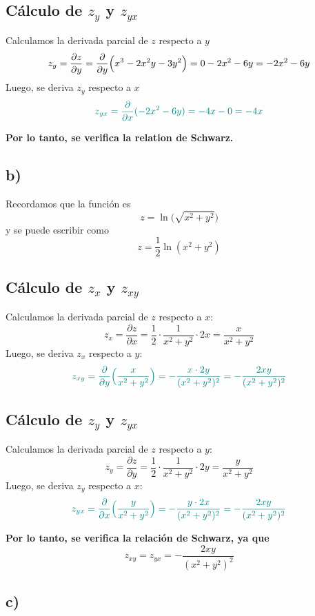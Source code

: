 \documentclass{article}
\begin{document}
\subsection*{Cálculo de \(z_y\) y \(z_{yx}\)}
Calculamos la derivada parcial de \(z\) respecto a \(y\)
\[
z_y = \frac{\partial z}{\partial y} = \frac{\partial}{\partial y}\Bigl(x^3 - 2x^2y - 3y^2\Bigr) = 0 - 2x^2 - 6y = -2x^2 - 6y
\]
Luego, se deriva \(z_y\) respecto a \(x\)
\[ \color{teal}
z_{yx} = \frac{\partial}{\partial x}(-2x^2 - 6y) = -4x - 0 = -4x
\]

\textbf{\color{teal}Por lo tanto, se verifica la relation de Schwarz.}


\subsection*{b)}

Recordamos que la función es 
\[
z = \ln\bigl(\sqrt{x^2+y^2}\bigr)
\]
y se puede escribir como
\[
z = \frac{1}{2}\ln(x^2+y^2)
\]

\subsection*{Cálculo de \(z_x\) y \(z_{xy}\)}
Calculamos la derivada parcial de \(z\) respecto a \(x\):
\[
z_x = \frac{\partial z}{\partial x} = \frac{1}{2}\cdot \frac{1}{x^2+y^2}\cdot 2x = \frac{x}{x^2+y^2}
\]
Luego, se deriva \(z_x\) respecto a \(y\):
\[\color{teal}
z_{xy} = \frac{\partial}{\partial y}\Bigl(\frac{x}{x^2+y^2}\Bigr) 
= -\frac{x\cdot 2y}{(x^2+y^2)^2} 
= -\frac{2xy}{(x^2+y^2)^2}
\]

\subsection*{Cálculo de \(z_y\) y \(z_{yx}\)}
Calculamos la derivada parcial de \(z\) respecto a \(y\):
\[
z_y = \frac{\partial z}{\partial y} = \frac{1}{2}\cdot \frac{1}{x^2+y^2}\cdot 2y = \frac{y}{x^2+y^2}
\]
Luego, se deriva \(z_y\) respecto a \(x\):
\[\color{teal}
z_{yx} = \frac{\partial}{\partial x}\Bigl(\frac{y}{x^2+y^2}\Bigr)
= -\frac{y\cdot 2x}{(x^2+y^2)^2}
= -\frac{2xy}{(x^2+y^2)^2}
\]

\textbf{\color{teal}Por lo tanto, se verifica la relación de Schwarz, ya que 
\[
z_{xy} = z_{yx} = -\frac{2xy}{(x^2+y^2)^2}
\]
}



\subsection*{c)}
\end{document}
